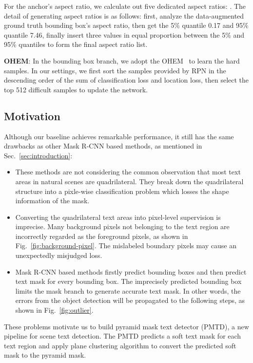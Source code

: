 \documentclass[10pt,twocolumn,letterpaper]{article}
\begin{document}
For the anchor's aspect ratio, we calculate out five dedicated aspect ratios: . The detail of generating aspect ratios is as follows: first, analyze the data-augmented ground truth bounding box's aspect ratio, then get the 5\% quantile 0.17 and 95\% quantile 7.46, finally insert three values in equal proportion between the 5\% and 95\% quantiles to form the final aspect ratio list.

\textbf{OHEM}: In the bounding box branch, we adopt the OHEM~\cite{shrivastava2016training} to learn the hard samples. In our settings, we first sort the samples provided by RPN in the descending order of the sum of classification loss and location loss, then select the top 512 difficult samples to update the network.


\subsection{Motivation}\label{subsec:motivation}

Although our baseline achieves remarkable performance, it still has the same drawbacks as other Mask R-CNN based methods, as mentioned in Sec.~\ref{sec:introduction}:

\begin{itemize}
    \item These methods are not considering the common observation that most text areas in natural scenes are quadrilateral. They break down the quadrilateral structure into a pixle-wise classification problem which losses the shape information of the mask.
    \item Converting the quadrilateral text areas into pixel-level supervision is imprecise. Many background pixels not belonging to the text region are incorrectly regarded as the foreground pixels, as shown in Fig.~\ref{fig:background-pixel}. The mislabeled boundary pixels may cause an unexpectedly misjudged loss.
    \item Mask R-CNN based methods firstly predict bounding boxes and then predict text mask for every bounding box. The imprecisely predicted bounding box limits the mask branch to generate accurate text mask. In other words, the errors from the object detection will be propagated to the following steps, as shown in Fig.~\ref{fig:outlier}.
\end{itemize}

These problems motivate us to build pyramid mask text detector (PMTD), a new pipeline for scene text detection. The PMTD predicts a soft text mask for each text region and apply plane clustering algorithm to convert the predicted soft mask to the pyramid mask.
\end{document}
